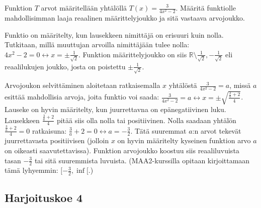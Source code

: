 	\begin{tehtava}
Funktion $T$ arvot määritellään yhtälöllä $T(x)=\frac{3}{4x^2-2}$. Määritä funktiolle mahdollisimman laaja reaalinen määrittelyjoukko ja sitä vastaava arvojoukko.
	\begin{vastaus}

Funktio on määritelty, kun lausekkeen nimittäjä on erisuuri kuin nolla. Tutkitaan, millä muuttujan arvoilla nimittäjään tulee nolla: $4x^2-2=0 \leftrightarrow x=\pm \frac{1}{\sqrt{2}}$. Funktion määrittelyjoukko on siis $\mathbb{R}\setminus{\frac{1}{\sqrt{2}}, -\frac{1}{\sqrt{2}}}$ eli reaalilukujen joukko, josta on poistettu $\pm \frac{1}{\sqrt{2}}$.

Arvojoukon selvittäminen aloitetaan ratkaisemalla $x$ yhtälöstä $\frac{3}{4x^2-2}=a$, missä $a$ esittää mahdollisia arvoja, joita funktio voi saada: $\frac{3}{4x^2-2}=a \leftrightarrow x=\pm \sqrt{\frac{\frac{3}{a}+2}{4}}$. Lauseke on hyvin määritelty, kun juurrettavna on epänegatiivinen luku. Lausekkeen $\frac{\frac{3}{a}+2}{4}$ pitää siis olla nolla tai positiivinen. Nolla saadaan yhtälön $\frac{\frac{3}{a}+2}{4}=0$ ratkaisuna: $\frac{3}{a}+2=0 \leftrightarrow a=-\frac{3}{2}$. Tätä suuremmat $a$:n arvot tekevät juurrettavasta positiivisen (jolloin $x$ on hyvin määritelty kyseinen funktion arvo $a$ on oikeasti saavutettavissa). Funktion arvojoukko koostuu siis reaaliluvuista tasan $-\frac{3}{2}$ tai sitä suuremmista luvuista. (MAA2-kurssilla opitaan kirjoittamaan tämä lyhyemmin: $[-\frac{3}{2},\inf[$.)
	\end{vastaus}
	\end{tehtava}

\newpage	
	
\subsection*{Harjoituskoe 4}

